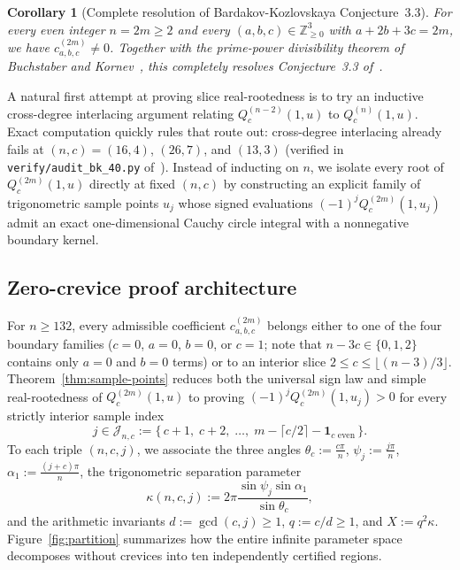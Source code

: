 \documentclass[10pt]{article}
\numberwithin{equation}{section}
\theoremstyle{plain}
\newtheorem{corollary}[theorem]{Corollary}
\theoremstyle{definition}
\newcommand{\Z}{\mathbb{Z}}
\newcommand{\1}{\mathbf{1}}
\newcommand{\code}[1]{\texttt{#1}}
\begin{document}
\begin{corollary}[Complete resolution of Bardakov-Kozlovskaya Conjecture~3.3]\label{cor:bk33}
For every even integer $n = 2m \ge 2$ and every $(a, b, c) \in \Z_{\ge 0}^3$ with $a + 2b + 3c = 2m$, we have $c_{a,b,c}^{(2m)} \ne 0$. Together with the prime-power divisibility theorem of Buchstaber and Kornev~\cite{BKor2025}, this completely resolves Conjecture~3.3 of~\cite{BK2023}.
\end{corollary}

A natural first attempt at proving slice real-rootedness is to try an inductive cross-degree interlacing argument relating $Q_c^{(n-2)}(1, u)$ to $Q_c^{(n)}(1, u)$. Exact computation quickly rules that route out: cross-degree interlacing already fails at $(n, c) = (16, 4)$, $(26, 7)$, and $(13, 3)$ (verified in \code{verify/audit\_bk\_40.py} of~\cite{JadavRepo2026}). Instead of inducting on $n$, we isolate every root of $Q_c^{(2m)}(1, u)$ directly at fixed $(n, c)$ by constructing an explicit family of trigonometric sample points $u_j$ whose signed evaluations $(-1)^j Q_c^{(2m)}(1, u_j)$ admit an exact one-dimensional Cauchy circle integral with a nonnegative boundary kernel.

\subsection{Zero-crevice proof architecture}
\label{sec:partition}

For $n \ge 132$, every admissible coefficient $c_{a,b,c}^{(2m)}$ belongs either to one of the four boundary families ($c = 0$, $a = 0$, $b = 0$, or $c = 1$; note that $n - 3c \in \{0, 1, 2\}$ contains only $a = 0$ and $b = 0$ terms) or to an interior slice $2 \le c \le \lfloor (n - 3)/3 \rfloor$. Theorem~\ref{thm:sample-points} reduces both the universal sign law and simple real-rootedness of $Q_c^{(2m)}(1, u)$ to proving $(-1)^j Q_c^{(2m)}(1, u_j) > 0$ for every strictly interior sample index
\begin{equation}\label{eq:Jnc}
j \in \mathcal{J}_{n, c} := \bigl\{\, c + 1,\; c + 2,\; \dots,\; m - \lceil c/2 \rceil - \1_{c\text{ even}} \,\bigr\}.
\end{equation}
To each triple $(n, c, j)$, we associate the three angles $\theta_c := \frac{c\pi}{n}$, $\psi_j := \frac{j\pi}{n}$, $\alpha_1 := \frac{(j+c)\pi}{n}$, the trigonometric separation parameter
\begin{equation}\label{eq:kappa}
\kappa(n, c, j) := 2\pi \frac{\sin\psi_j \sin\alpha_1}{\sin\theta_c},
\end{equation}
and the arithmetic invariants $d := \gcd(c, j) \ge 1$, $q := c/d \ge 1$, and $X := q^2 \kappa$. Figure~\ref{fig:partition} summarizes how the entire infinite parameter space decomposes without crevices into ten independently certified regions.
\end{document}
